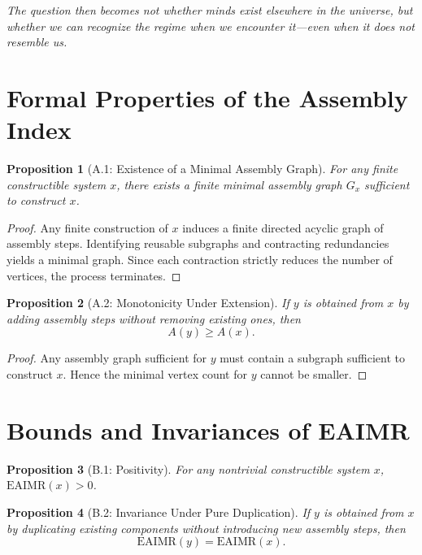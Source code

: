 \documentclass[11pt,letterpaper]{article}
\newtheorem{proposition}{Proposition}
\begin{document}
\textit{The question then becomes not whether minds exist elsewhere in the universe, but whether we can recognize the regime when we encounter it—even when it does not resemble us.}

\printbibliography

\appendix

\section{Formal Properties of the Assembly Index}

\begin{proposition}[A.1: Existence of a Minimal Assembly Graph]
For any finite constructible system $x$, there exists a finite minimal assembly graph $G_x$ sufficient to construct $x$.
\end{proposition}

\begin{proof}
Any finite construction of $x$ induces a finite directed acyclic graph of assembly steps. Identifying reusable subgraphs and contracting redundancies yields a minimal graph. Since each contraction strictly reduces the number of vertices, the process terminates.
\end{proof}

\begin{proposition}[A.2: Monotonicity Under Extension]
If $y$ is obtained from $x$ by adding assembly steps without removing existing ones, then
\[
A(y) \geq A(x).
\]
\end{proposition}

\begin{proof}
Any assembly graph sufficient for $y$ must contain a subgraph sufficient to construct $x$. Hence the minimal vertex count for $y$ cannot be smaller.
\end{proof}

\section{Bounds and Invariances of EAIMR}

\begin{proposition}[B.1: Positivity]
For any nontrivial constructible system $x$, $\mathrm{EAIMR}(x) > 0$.
\end{proposition}

\begin{proposition}[B.2: Invariance Under Pure Duplication]
If $y$ is obtained from $x$ by duplicating existing components without introducing new assembly steps, then
\[
\mathrm{EAIMR}(y) = \mathrm{EAIMR}(x).
\]
\end{proposition}
\end{document}
